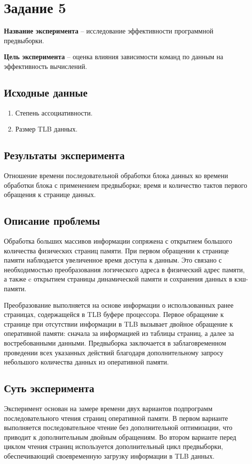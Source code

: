 \section{Задание 5}

\textbf{Название эксперимента} -- исследование эффективности программной
предвыборки.

\textbf{Цель эксперимента} -- оценка влияния зависимости команд по данным на
эффективность вычислений.

\subsection{Исходные данные}
\begin{enumerate}
	\item Степень ассоциативности.
	\item Размер TLB данных.
\end{enumerate}

\subsection{Результаты эксперимента}
Отношение времени последовательной обработки блока данных ко времени обработки
блока с применением предвыборки; время и количество тактов первого обращения к
странице данных.


\subsection{Описание проблемы}
Обработка больших массивов информации сопряжена с открытием большого количества
физических страниц памяти. При первом обращении к странице памяти наблюдается
увеличенное время доступа к данным. Это связано с необходимостью преобразования
логического адреса в физический адрес памяти, а также c открытием страницы
динамической памяти и сохранения данных в кэш-памяти.

Преобразование выполняется на основе информации о использованных ранее
страницах, содержащейся в TLB буфере процессора. Первое обращение к странице
при отсутствии информации в TLB вызывает двойное обращение к оперативной
памяти: сначала за информацией из таблицы страниц, а далее за востребованными
данными. Предвыборка заключается в заблаговременном проведении всех
указанных действий благодаря дополнительному запросу небольшого количества
данных из оперативной памяти.

\subsection{Суть эксперимента}  
Эксперимент основан на замере времени двух вариантов подпрограмм
последовательного чтения страниц оперативной памяти. В первом варианте
выполняется последовательное чтение без дополнительной оптимизации, что
приводит к дополнительным двойным обращениям. Во втором варианте перед циклом
чтения страниц используется дополнительный цикл предвыборки, обеспечивающий
своевременную загрузку информации в TLB данных. 

